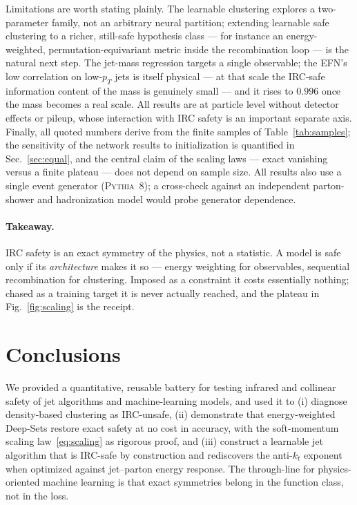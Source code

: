 \documentclass[11pt]{article}
\newcommand{\kt}{k_{t}}
\newcommand{\antikt}{anti-$\kt$}
\newcommand{\pt}{p_{T}}
\begin{document}
Limitations are worth stating plainly. The learnable clustering explores a two-parameter
family, not an arbitrary neural partition; extending learnable safe clustering to a richer,
still-safe hypothesis class --- for instance an energy-weighted, permutation-equivariant
metric inside the recombination loop --- is the natural next step. The jet-mass regression
targets a single observable; the EFN's low correlation on low-$\pt$ jets is itself physical
--- at that scale the IRC-safe information content of the mass is genuinely small --- and it
rises to $0.996$ once the mass becomes a real scale. All results are at particle level
without detector effects or pileup, whose interaction with IRC safety is an important
separate axis. Finally, all quoted numbers derive from the finite samples of
Table~\ref{tab:samples}; the sensitivity of the network results to initialization is
quantified in Sec.~\ref{sec:equal}, and the central claim of the scaling laws --- exact
vanishing versus a finite plateau --- does not depend on sample size. All results also use a
single event generator (\textsc{Pythia}~8); a cross-check against an independent
parton-shower and hadronization model would probe generator dependence.

\paragraph{Takeaway.}
IRC safety is an exact symmetry of the physics, not a statistic. A model is safe only if its
\emph{architecture} makes it so --- energy weighting for observables, sequential
recombination for clustering. Imposed as a constraint it costs essentially nothing; chased
as a training target it is never actually reached, and the plateau in Fig.~\ref{fig:scaling}
is the receipt.

\section{Conclusions}
We provided a quantitative, reusable battery for testing infrared and collinear safety of
jet algorithms and machine-learning models, and used it to (i) diagnose density-based
clustering as IRC-unsafe, (ii) demonstrate that energy-weighted Deep-Sets restore exact
safety at no cost in accuracy, with the soft-momentum scaling law~\eqref{eq:scaling} as
rigorous proof, and (iii) construct a learnable jet algorithm that is IRC-safe by
construction and rediscovers the \antikt{} exponent when optimized against jet--parton
energy response. The through-line for physics-oriented machine learning is that exact
symmetries belong in the function class, not in the loss.
\end{document}
